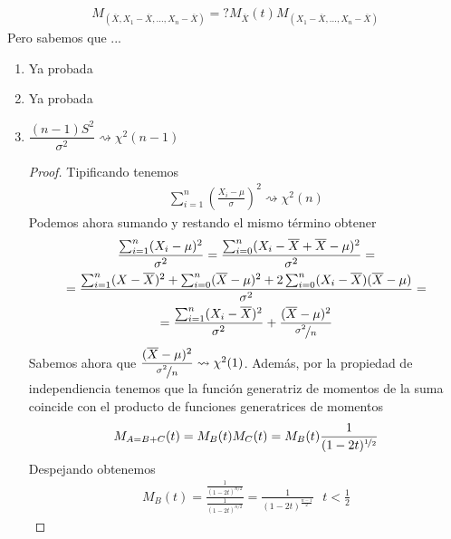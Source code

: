 \begin{ejercicio}
    \begin{gather*}
        M_{(\overline{X}, X_1-\overline{X}, \dots, X_n-\overline{X})} =? M_{\overline{X}}(t) M_{(X_1-\overline{X}, \dots, X_n-\overline{X})}
    \end{gather*}
    Pero sabemos que 
    ...

    \begin{enumerate}
        \item Ya probada
        \item Ya probada
        \item $\dfrac{(n-1)S^2}{\sigma^2} \rightsquigarrow  \chi^2(n-1)$
        \begin{proof}
            Tipificando tenemos
            \begin{gather*}
                \sum_{i=1}^n \left(\frac{X_i - \mu}{\sigma}\right)^2 \rightsquigarrow \chi^2(n)
            \end{gather*}
            Podemos ahora sumando y restando el mismo término obtener
            \begin{gather*}
                \frac{\sum_{i=1}^n (X_i-\mu)^2}{\sigma^2} = \frac{\sum_{i=0}^n (X_i - \overline{X} + \overline{X} - \mu)^2}{\sigma^2} =\\
                = \frac{\sum_{i=1}^n (X-\overline{X})^2 + \sum_{i=0}^n (\overline{X}-\mu)^2 + 2\sum_{i=0}^n(X_i-\overline{X})(\overline{X}-\mu)}{\sigma^2} =\\
                = \frac{\sum_{i=1}^n (X_i-\overline{X})^2}{\sigma^2} + \frac{(\overline{X}-\mu)^2}{\nicefrac{\sigma^2}{n}}
            \end{gather*}
            Sabemos ahora que $\dfrac{(\overline{X}-\mu)^2}{\nicefrac{\sigma^2}{n}} \rightsquigarrow \chi^2(1)$. Además, por la propiedad de independiencia tenemos que la función generatriz de momentos de la suma coincide con el producto de funciones generatrices de momentos
            \begin{gather*}
                M_{A=B+C}(t) = M_B(t)M_C(t) = M_B(t)\frac{1}{(1-2t)^{\nicefrac{1}{2}}}
            \end{gather*}
            Despejando obtenemos
            \begin{gather*}
                M_B(t) = 
                \frac{\frac{1}{(1-2t)^{n/2}}}{\frac{1}{(1-2t)^{n/2}}} = \frac{1}{(1-2t)^\frac{n-1}{2}}\ \ \ t<\frac{1}{2}
            \end{gather*}
        \end{proof}


\end{enumerate}
\end{ejercicio}
